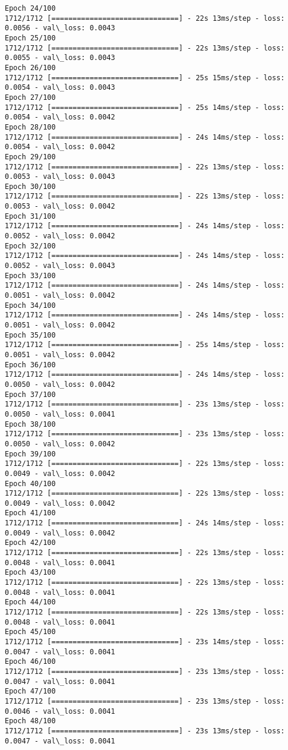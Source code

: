 \documentclass[11pt]{article}
\begin{document}
\begin{Verbatim}[commandchars=\\\{\}]
Epoch 24/100
1712/1712 [==============================] - 22s 13ms/step - loss: 0.0056 - val\_loss: 0.0043
Epoch 25/100
1712/1712 [==============================] - 22s 13ms/step - loss: 0.0055 - val\_loss: 0.0043
Epoch 26/100
1712/1712 [==============================] - 25s 15ms/step - loss: 0.0054 - val\_loss: 0.0043
Epoch 27/100
1712/1712 [==============================] - 25s 14ms/step - loss: 0.0054 - val\_loss: 0.0042
Epoch 28/100
1712/1712 [==============================] - 24s 14ms/step - loss: 0.0054 - val\_loss: 0.0042
Epoch 29/100
1712/1712 [==============================] - 22s 13ms/step - loss: 0.0053 - val\_loss: 0.0043
Epoch 30/100
1712/1712 [==============================] - 22s 13ms/step - loss: 0.0053 - val\_loss: 0.0042
Epoch 31/100
1712/1712 [==============================] - 24s 14ms/step - loss: 0.0052 - val\_loss: 0.0042
Epoch 32/100
1712/1712 [==============================] - 24s 14ms/step - loss: 0.0052 - val\_loss: 0.0043
Epoch 33/100
1712/1712 [==============================] - 24s 14ms/step - loss: 0.0051 - val\_loss: 0.0042
Epoch 34/100
1712/1712 [==============================] - 24s 14ms/step - loss: 0.0051 - val\_loss: 0.0042
Epoch 35/100
1712/1712 [==============================] - 25s 14ms/step - loss: 0.0051 - val\_loss: 0.0042
Epoch 36/100
1712/1712 [==============================] - 24s 14ms/step - loss: 0.0050 - val\_loss: 0.0042
Epoch 37/100
1712/1712 [==============================] - 23s 13ms/step - loss: 0.0050 - val\_loss: 0.0041
Epoch 38/100
1712/1712 [==============================] - 23s 13ms/step - loss: 0.0050 - val\_loss: 0.0042
Epoch 39/100
1712/1712 [==============================] - 22s 13ms/step - loss: 0.0049 - val\_loss: 0.0042
Epoch 40/100
1712/1712 [==============================] - 22s 13ms/step - loss: 0.0049 - val\_loss: 0.0042
Epoch 41/100
1712/1712 [==============================] - 24s 14ms/step - loss: 0.0049 - val\_loss: 0.0042
Epoch 42/100
1712/1712 [==============================] - 22s 13ms/step - loss: 0.0048 - val\_loss: 0.0041
Epoch 43/100
1712/1712 [==============================] - 22s 13ms/step - loss: 0.0048 - val\_loss: 0.0041
Epoch 44/100
1712/1712 [==============================] - 22s 13ms/step - loss: 0.0048 - val\_loss: 0.0041
Epoch 45/100
1712/1712 [==============================] - 23s 14ms/step - loss: 0.0047 - val\_loss: 0.0041
Epoch 46/100
1712/1712 [==============================] - 23s 13ms/step - loss: 0.0047 - val\_loss: 0.0041
Epoch 47/100
1712/1712 [==============================] - 23s 13ms/step - loss: 0.0046 - val\_loss: 0.0041
Epoch 48/100
1712/1712 [==============================] - 23s 13ms/step - loss: 0.0047 - val\_loss: 0.0041

\end{Verbatim}
\end{document}
